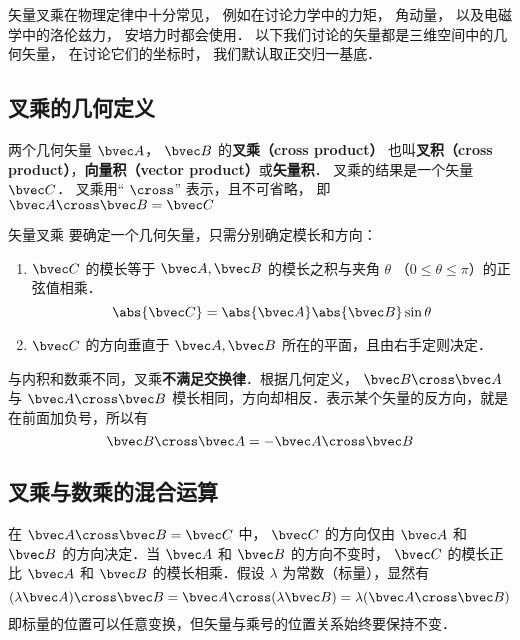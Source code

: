 

矢量叉乘在物理定律中十分常见， 例如在讨论力学中的力矩， 角动量， 以及电磁学中的洛伦兹力， 安培力时都会使用． 以下我们讨论的矢量都是三维空间中的几何矢量， 在讨论它们的坐标时， 我们默认取正交归一基底．

\subsection{叉乘的几何定义}
两个几何矢量 $\bvec A$，  $\bvec B$ 的\textbf{叉乘（cross product）} 也叫\textbf{叉积（cross product）}，\textbf{向量积（vector product）}或\textbf{矢量积}． 叉乘的结果是一个矢量 $\bvec C$．  叉乘用“ $\cross$” 表示，且不可省略， 即 $ \bvec A \cross \bvec B = \bvec C$

\begin{definition}{矢量叉乘}
要确定一个几何矢量，只需分别确定模长和方向：
\begin{enumerate}
\item $\bvec C$ 的模长等于 $\bvec A, \bvec B$ 的模长之积与夹角 $\theta$ （$0 \leqslant \theta \leqslant \pi$）的正弦值相乘．
\begin{equation}\label{Cross_eq1}
\abs{\bvec C}  = \abs{\bvec A} \abs{\bvec B} \sin\theta 
\end{equation}
\item $\bvec C$ 的方向垂直于 $\bvec A, \bvec B$ 所在的平面，且由右手定则决定．
\end{enumerate}
\end{definition}

与内积和数乘不同，叉乘\textbf{不满足交换律}．根据几何定义， $\bvec B \cross \bvec A$ 与 $\bvec A \cross \bvec B$ 模长相同，方向却相反．表示某个矢量的反方向，就是在前面加负号，所以有
\begin{equation}\label{Cross_eq11}
\bvec B \cross \bvec A = -\bvec A \cross \bvec B
\end{equation}

\subsection{叉乘与数乘的混合运算}

在 $\bvec A \cross \bvec B = \bvec C$ 中， $\bvec C$ 的方向仅由 $\bvec A$ 和 $\bvec B$ 的方向决定．当 $\bvec A$ 和 $\bvec B$ 的方向不变时， $\bvec C$ 的模长正比 $\bvec A$ 和 $\bvec B$ 的模长相乘．假设 $\lambda $ 为常数（标量），显然有
\begin{equation}
(\lambda \bvec A) \cross \bvec B = \bvec A \cross (\lambda \bvec B) = \lambda (\bvec A \cross \bvec B)
\end{equation}
即标量的位置可以任意变换，但矢量与乘号的位置关系始终要保持不变．

